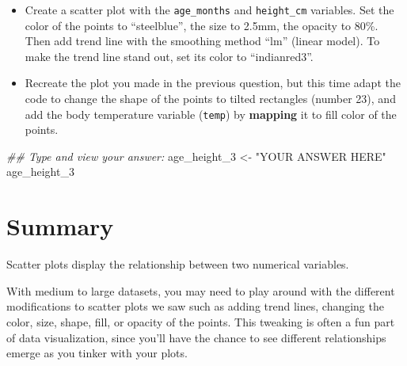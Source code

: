 \documentclass[
  letterpaper,
  DIV=11,
  numbers=noendperiod]{scrreprt}
\newenvironment{Shaded}{\begin{snugshade}}{\end{snugshade}}
\newcommand{\DocumentationTok}[1]{\textcolor[rgb]{0.37,0.37,0.37}{\textit{#1}}}
\newcommand{\NormalTok}[1]{\textcolor[rgb]{0.00,0.23,0.31}{#1}}
\newcommand{\OtherTok}[1]{\textcolor[rgb]{0.00,0.23,0.31}{#1}}
\newcommand{\StringTok}[1]{\textcolor[rgb]{0.13,0.47,0.30}{#1}}
\begin{document}
\begin{tcolorbox}[enhanced jigsaw, colframe=quarto-callout-tip-color-frame, colbacktitle=quarto-callout-tip-color!10!white, titlerule=0mm, opacitybacktitle=0.6, breakable, toprule=.15mm, arc=.35mm, rightrule=.15mm, colback=white, bottomrule=.15mm, opacityback=0, toptitle=1mm, left=2mm, bottomtitle=1mm, title=\textcolor{quarto-callout-tip-color}{\faLightbulb}\hspace{0.5em}{Practice}, leftrule=.75mm, coltitle=black]

\begin{itemize}
\item
  Create a scatter plot with the \texttt{age\_months} and
  \texttt{height\_cm} variables. Set the color of the points to
  ``steelblue'', the size to 2.5mm, the opacity to 80\%. Then add trend
  line with the smoothing method ``lm'' (linear model). To make the
  trend line stand out, set its color to ``indianred3''.
\item
  Recreate the plot you made in the previous question, but this time
  adapt the code to change the shape of the points to tilted rectangles
  (number 23), and add the body temperature variable (\texttt{temp}) by
  \textbf{mapping} it to fill color of the points.
\end{itemize}

\begin{Shaded}
\begin{Highlighting}[]
\DocumentationTok{\#\# Type and view your answer:}
\NormalTok{age\_height\_3 }\OtherTok{\textless{}{-}}  \StringTok{"YOUR ANSWER HERE"}
\NormalTok{age\_height\_3}
\end{Highlighting}
\end{Shaded}

\end{tcolorbox}

\hypertarget{summary}{%
\section{Summary}\label{summary}}

Scatter plots display the relationship between two numerical variables.

With medium to large datasets, you may need to play around with the
different modifications to scatter plots we saw such as adding trend
lines, changing the color, size, shape, fill, or opacity of the points.
This tweaking is often a fun part of data visualization, since you'll
have the chance to see different relationships emerge as you tinker with
your plots.
\end{document}
